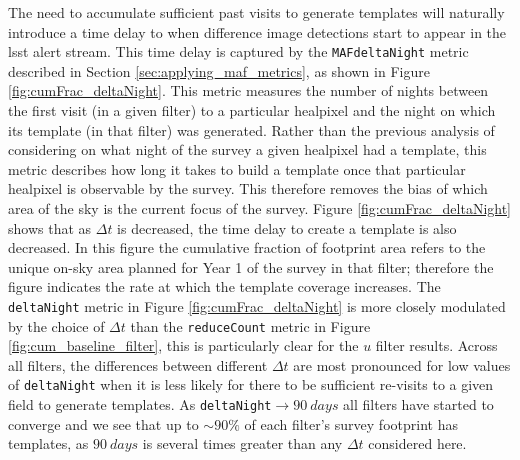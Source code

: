 \documentclass[preprintm,linenumbers]{aastex631}
\newcommand{\deltaNight}{\texttt{deltaNight}\xspace}
\newcommand{\reduceCount}{\texttt{reduceCount}\xspace}
\newcommand{\maf}{\texttt{MAF}\xspace}
\providecommand{\red}[1]{\textcolor{red}{#1}}
\begin{document}
		
		The need to accumulate sufficient past visits to generate templates will naturally introduce a time delay to when difference image detections start to appear in the \gls*{lsst} alert stream.
		This time delay is captured by the \maf \deltaNight metric described in Section \ref{sec:applying_maf_metrics}, as shown in Figure \ref{fig:cumFrac_deltaNight}.
		This metric measures the number of nights between the first visit (in a given filter) to a particular healpixel and the night on which its template (in that filter) was generated.
  Rather than the previous analysis of considering on what night of the survey a given healpixel had a template, this metric describes how long it takes to build a template once that particular healpixel is observable by the survey.
		This therefore removes the bias of which area of the sky is the current focus of the survey. %
Figure \ref{fig:cumFrac_deltaNight} shows that as $\Delta t$ is decreased, the time delay to create a template is also decreased.
		In this figure the cumulative fraction of footprint area refers to the unique on-sky area planned for Year 1 of the survey in that filter; therefore the figure indicates the rate at which the template coverage increases.
		The \deltaNight metric in Figure \ref{fig:cumFrac_deltaNight} is more closely modulated by the choice of $\Delta t$ than the \reduceCount metric in Figure \ref{fig:cum_baseline_filter}, this is particularly clear for the $u$ filter results. %
		Across all filters, the differences between different $\Delta t$ are most pronounced for low values of \deltaNight when it is less likely for there to be sufficient re-visits to a given field to generate templates. 
		As \deltaNight$\rightarrow 90\ \si{days}$ all filters have started to converge and we see that up to $\sim 90\%$ of each filter's survey footprint has templates, as $90\ \si{days}$ is several times greater than any $\Delta t$ considered here. 
		\\
\end{document}
